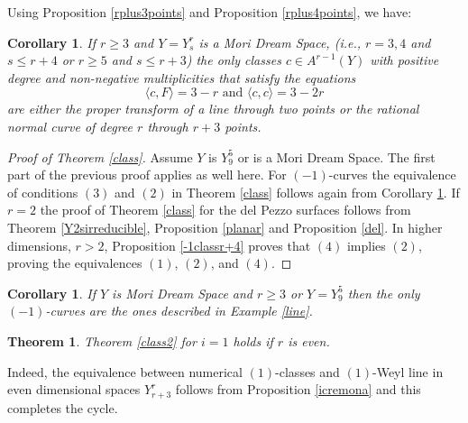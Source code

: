 \documentclass[12pt]{article}
\newtheorem{theorem}[equation]{Theorem}
\newtheorem{corollary}[equation]{Corollary}
\numberwithin{equation}{section}
\numberwithin{subeq}{equation}
\begin{document}
Using Proposition \ref{rplus3points} and Proposition \ref{rplus4points}, we have:

\begin{corollary}\label{MDSminus1}
If $r\geq 3$ and $Y=Y^r_s$ is a Mori Dream Space,
(i.e., $r=3,4$ and $s\leq r+4$ or $r \geq 5$ and $s \leq  r+3$)
the only classes $c\in A^{r-1}(Y)$ 
with positive degree and non-negative multiplicities
that satisfy the equations
$$ \langle c, F \rangle= 3-r \text{ and }  \langle c, c \rangle= 3-2r$$
are either the proper transform of a line through two points or the rational normal curve of degree $r$ through $r+3$ points.
\end{corollary}





\begin{proof}[Proof of Theorem \ref{class}] Assume $Y$ is $Y^5_9$ or is a Mori Dream Space.
The first part of the previous proof applies as well here.
For $(-1)$-curves the equivalence of conditions $(3)$ and $(2)$ in Theorem \ref{class}
follows again from Corollary \ref{MDSminus1}. 
 If $r=2$ the proof of Theorem  \ref{class} for the del Pezzo surfaces follows from Theorem \ref{Y2sirreducible}, Proposition \ref{planar} and Proposition \ref{del}.
 In higher dimensions, $r>2$, Proposition \ref{-1classr+4} proves that $(4)$ implies $(2)$, proving the equivalences $(1)$, $(2)$, and $(4)$. 
\end{proof}

\begin{corollary}\label{main theorem}
If $Y$ is Mori Dream Space and $r\geq 3$ or $Y=Y^5_9$
then the only $(-1)$-curves are the ones described in Example \ref{line}.
\end{corollary}


\begin{theorem}\label{class3}
Theorem \ref{class2} for $i=1$ 
holds  if $r$ is even.
\end{theorem}
Indeed, the equivalence  between  numerical $(1)$-classes and  $(1)$-Weyl line  in even dimensional spaces $Y^r_{r+3}$ follows from  Proposition \ref{icremona} and this completes the cycle.
\end{document}
